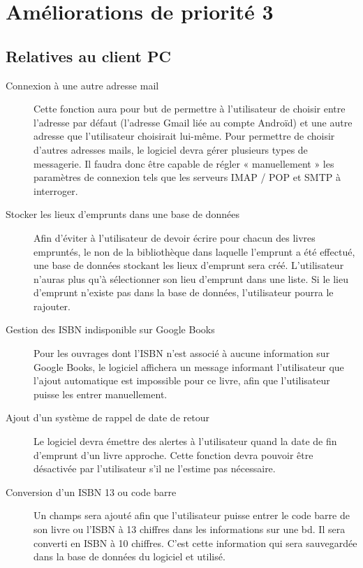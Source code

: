\section{Améliorations de priorité 3}

\subsection{Relatives au client PC}

\begin{description}
\item[Connexion à une autre adresse mail]
	Cette fonction aura pour but de permettre à l'utilisateur de choisir entre l'adresse par défaut (l'adresse Gmail liée au compte Androïd) et une autre adresse que l'utilisateur choisirait lui-même. 
	Pour permettre de choisir d'autres adresses mails, le logiciel devra gérer plusieurs types de messagerie.
	Il faudra donc être capable de régler « manuellement » les paramètres de connexion tels que les serveurs IMAP / POP et SMTP à interroger.

\item[Stocker les lieux d'emprunts dans une base de données]
	Afin d'éviter à l'utilisateur de devoir écrire pour chacun des livres empruntés, le non de la bibliothèque dans laquelle l'emprunt a été effectué, une base de données stockant les lieux d'emprunt sera créé. 
	L'utilisateur n'auras plus qu'à sélectionner son lieu d'emprunt dans une liste. 
	Si le lieu d'emprunt n'existe pas dans la base de données, l'utilisateur pourra le rajouter.

\item[Gestion des ISBN indisponible sur Google Books]
	Pour les ouvrages dont l'ISBN n'est associé à aucune information sur Google Books, le logiciel affichera un message informant l'utilisateur que l'ajout automatique est impossible pour ce livre, afin que l'utilisateur puisse les entrer manuellement.   

\item[Ajout d'un système de rappel de date de retour]
	Le logiciel devra émettre des alertes à l'utilisateur quand la date de fin d'emprunt d'un livre approche. 
	Cette fonction devra pouvoir être désactivée par l'utilisateur s'il ne l'estime pas nécessaire.

\item[Conversion d'un ISBN 13 ou code barre]
	Un champs sera ajouté afin que l'utilisateur puisse entrer le code barre de son livre ou l'ISBN à 13 chiffres dans les informations sur une bd. Il sera converti en ISBN à 10 chiffres. C'est cette information qui sera sauvegardée dans la base de données du logiciel et utilisé.

\end{description}
